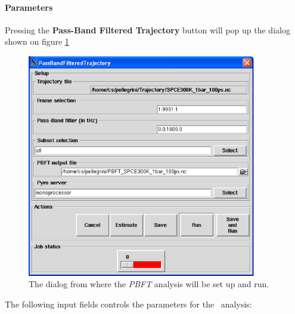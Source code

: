 \documentclass[a4paper,11pt]{report}
\begin{document}
\paragraph{Parameters\\}
\label{pbft_parameters}
Pressing the \textbf{Pass-Band Filtered Trajectory} button will pop up the dialog shown on figure \ref{fig:pbft}
\begin{figure}[h!]
\begin{center}
\includegraphics[width=10cm]{Figures/pbft.eps}
\end{center}
\caption[The \textit{PBFT} analysis dialog]{The dialog from where the \textit{PBFT} analysis will be set up and run.}
\label{fig:pbft}
\end{figure}   

The following input fields controls the parameters for the \PBFT\ analysis:
\end{document}

